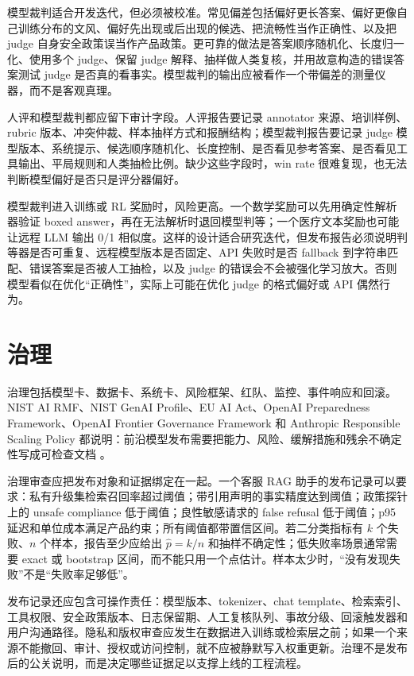 \documentclass[UTF8,zihao=-4,openany]{ctexbook}
\begin{document}
模型裁判适合开发迭代，但必须被校准。常见偏差包括偏好更长答案、偏好更像自己训练分布的文风、偏好先出现或后出现的候选、把流畅性当作正确性、以及把 judge 自身安全政策误当作产品政策。更可靠的做法是答案顺序随机化、长度归一化、使用多个 judge、保留 judge 解释、抽样做人类复核，并用故意构造的错误答案测试 judge 是否真的看事实。模型裁判的输出应被看作一个带偏差的测量仪器，而不是客观真理。

人评和模型裁判都应留下审计字段。人评报告要记录 annotator 来源、培训样例、rubric 版本、冲突仲裁、样本抽样方式和报酬结构；模型裁判报告要记录 judge 模型版本、系统提示、候选顺序随机化、长度控制、是否看见参考答案、是否看见工具输出、平局规则和人类抽检比例。缺少这些字段时，win rate 很难复现，也无法判断模型偏好是否只是评分器偏好。

模型裁判进入训练或 RL 奖励时，风险更高。一个数学奖励可以先用确定性解析器验证 boxed answer，再在无法解析时退回模型判等；一个医疗文本奖励也可能让远程 LLM 输出 0/1 相似度。这样的设计适合研究迭代，但发布报告必须说明判等器是否可重复、远程模型版本是否固定、API 失败时是否 fallback 到字符串匹配、错误答案是否被人工抽检，以及 judge 的错误会不会被强化学习放大。否则模型看似在优化“正确性”，实际上可能在优化 judge 的格式偏好或 API 偶然行为。

\section{治理}
治理包括模型卡、数据卡、系统卡、风险框架、红队、监控、事件响应和回滚。NIST AI RMF、NIST GenAI Profile、EU AI Act、OpenAI Preparedness Framework、OpenAI Frontier Governance Framework 和 Anthropic Responsible Scaling Policy 都说明：前沿模型发布需要把能力、风险、缓解措施和残余不确定性写成可检查文档 \cite{nist2023airmf,nist2024genai,europeanunion2024aiact,openai2025preparedness,openai2026frontiergovernance,anthropic2026rspv3}。

治理审查应把发布对象和证据绑定在一起。一个客服 RAG 助手的发布记录可以要求：私有升级集检索召回率超过阈值；带引用声明的事实精度达到阈值；政策探针上的 unsafe compliance 低于阈值；良性敏感请求的 false refusal 低于阈值；p95 延迟和单位成本满足产品约束；所有阈值都带置信区间。若二分类指标有 $k$ 个失败、$n$ 个样本，报告至少应给出 $\hat{p}=k/n$ 和抽样不确定性；低失败率场景通常需要 exact 或 bootstrap 区间，而不能只用一个点估计。样本太少时，“没有发现失败”不是“失败率足够低”。

发布记录还应包含可操作责任：模型版本、tokenizer、chat template、检索索引、工具权限、安全政策版本、日志保留期、人工复核队列、事故分级、回滚触发器和用户沟通路径。隐私和版权审查应发生在数据进入训练或检索层之前；如果一个来源不能撤回、审计、授权或访问控制，就不应被静默写入权重更新。治理不是发布后的公关说明，而是决定哪些证据足以支撑上线的工程流程。
\end{document}
